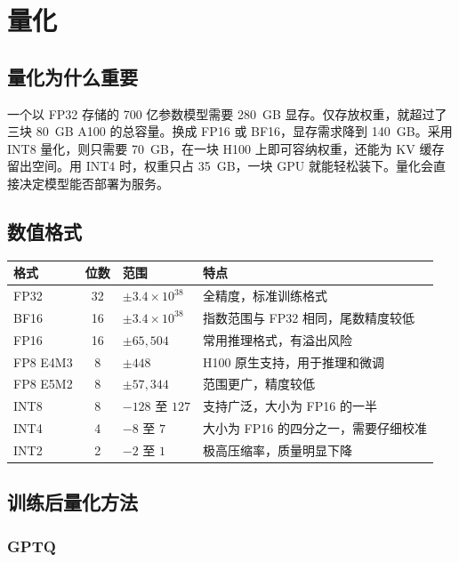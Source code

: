 \chapter{量化}
\label{ch:quantization}

\section{量化为什么重要}

一个以 FP32 存储的 700 亿参数模型需要 280~GB 显存。仅存放权重，就超过了三块 80~GB A100 的总容量。换成 FP16 或 BF16，显存需求降到 140~GB。采用 INT8 量化，则只需要 70~GB，在一块 H100 上即可容纳权重，还能为 KV 缓存留出空间。用 INT4 时，权重只占 35~GB，一块 GPU 就能轻松装下。量化会直接决定模型能否部署为服务。

\section{数值格式}

\begin{center}
\begin{tabularx}{0.91\linewidth}{@{}lcl>{\raggedright\arraybackslash}X@{}}
\toprule
\textbf{格式} & \textbf{位数} & \textbf{范围} & \textbf{特点} \\
\midrule
FP32 & 32 & $\pm3.4\times10^{38}$ & 全精度，标准训练格式 \\
BF16 & 16 & $\pm3.4\times10^{38}$ & 指数范围与 FP32 相同，尾数精度较低 \\
FP16 & 16 & $\pm65{,}504$ & 常用推理格式，有溢出风险 \\
FP8 E4M3 & 8 & $\pm448$ & H100 原生支持，用于推理和微调 \\
FP8 E5M2 & 8 & $\pm57{,}344$ & 范围更广，精度较低 \\
INT8 & 8 & $-128$ 至 $127$ & 支持广泛，大小为 FP16 的一半 \\
INT4 & 4 & $-8$ 至 $7$ & 大小为 FP16 的四分之一，需要仔细校准 \\
INT2 & 2 & $-2$ 至 $1$ & 极高压缩率，质量明显下降 \\
\bottomrule
\end{tabularx}
\end{center}

\section{训练后量化方法}

\subsection{GPTQ}

